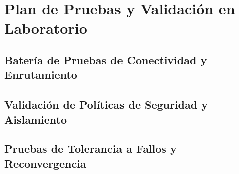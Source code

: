 \section{Plan de Pruebas y Validación en Laboratorio}
\label{sec:plan_pruebas}

\subsection{Batería de Pruebas de Conectividad y Enrutamiento}
\label{subsec:pruebas_conectividad}

\subsection{Validación de Políticas de Seguridad y Aislamiento}
\label{subsec:pruebas_seguridad}

\subsection{Pruebas de Tolerancia a Fallos y Reconvergencia}
\label{subsec:pruebas_tolerancia_fallos}

